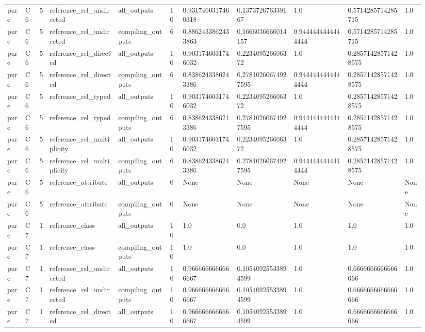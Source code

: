 \begin{tabular}{lllllllllll}
pure & C6 & 5 & reference\_rel\_undirected & all\_outputs & 10 & 0.9317460317460318 & 0.137372676339167 & 1.0 & 0.5714285714285715 & 1.0 \\
pure & C6 & 5 & reference\_rel\_undirected & compiling\_outputs & 6 & 0.8862433862433863 & 0.1666036666014157 & 0.9444444444444444 & 0.5714285714285715 & 1.0 \\
pure & C6 & 5 & reference\_rel\_directed & all\_outputs & 10 & 0.9031746031746032 & 0.223409526606372 & 1.0 & 0.28571428571428575 & 1.0 \\
pure & C6 & 5 & reference\_rel\_directed & compiling\_outputs & 6 & 0.8386243386243386 & 0.27810260674927595 & 0.9444444444444444 & 0.28571428571428575 & 1.0 \\
pure & C6 & 5 & reference\_rel\_typed & all\_outputs & 10 & 0.9031746031746032 & 0.223409526606372 & 1.0 & 0.28571428571428575 & 1.0 \\
pure & C6 & 5 & reference\_rel\_typed & compiling\_outputs & 6 & 0.8386243386243386 & 0.27810260674927595 & 0.9444444444444444 & 0.28571428571428575 & 1.0 \\
pure & C6 & 5 & reference\_rel\_multiplicity & all\_outputs & 10 & 0.9031746031746032 & 0.223409526606372 & 1.0 & 0.28571428571428575 & 1.0 \\
pure & C6 & 5 & reference\_rel\_multiplicity & compiling\_outputs & 6 & 0.8386243386243386 & 0.27810260674927595 & 0.9444444444444444 & 0.28571428571428575 & 1.0 \\
pure & C6 & 5 & reference\_attribute & all\_outputs & 0 & None & None & None & None & None \\
pure & C6 & 5 & reference\_attribute & compiling\_outputs & 0 & None & None & None & None & None \\
pure & C7 & 1 & reference\_class & all\_outputs & 10 & 1.0 & 0.0 & 1.0 & 1.0 & 1.0 \\
pure & C7 & 1 & reference\_class & compiling\_outputs & 10 & 1.0 & 0.0 & 1.0 & 1.0 & 1.0 \\
pure & C7 & 1 & reference\_rel\_undirected & all\_outputs & 10 & 0.9666666666666667 & 0.10540925533894599 & 1.0 & 0.6666666666666666 & 1.0 \\
pure & C7 & 1 & reference\_rel\_undirected & compiling\_outputs & 10 & 0.9666666666666667 & 0.10540925533894599 & 1.0 & 0.6666666666666666 & 1.0 \\
pure & C7 & 1 & reference\_rel\_directed & all\_outputs & 10 & 0.9666666666666667 & 0.10540925533894599 & 1.0 & 0.6666666666666666 & 1.0 \\

\end{tabular}
